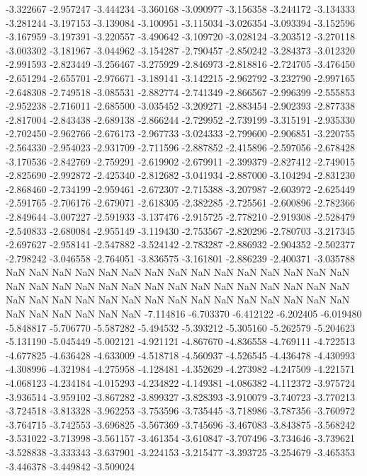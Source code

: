 -3.322667
-2.957247
-3.444234
-3.360168
-3.090977
-3.156358
-3.244172
-3.134333
-3.281244
-3.197153
-3.139084
-3.100951
-3.115034
-3.026354
-3.093394
-3.152596
-3.167959
-3.197391
-3.220557
-3.490642
-3.109720
-3.028124
-3.203512
-3.270118
-3.003302
-3.181967
-3.044962
-3.154287
-2.790457
-2.850242
-3.284373
-3.012320
-2.991593
-2.823449
-3.256467
-3.275929
-2.846973
-2.818816
-2.724705
-3.476450
-2.651294
-2.655701
-2.976671
-3.189141
-3.142215
-2.962792
-3.232790
-2.997165
-2.648308
-2.749518
-3.085531
-2.882774
-2.741349
-2.866567
-2.996399
-2.555853
-2.952238
-2.716011
-2.685500
-3.035452
-3.209271
-2.883454
-2.902393
-2.877338
-2.817004
-2.843438
-2.689138
-2.866244
-2.729952
-2.739199
-3.315191
-2.935330
-2.702450
-2.962766
-2.676173
-2.967733
-3.024333
-2.799600
-2.906851
-3.220755
-2.564330
-2.954023
-2.931709
-2.711596
-2.887852
-2.415896
-2.597056
-2.678428
-3.170536
-2.842769
-2.759291
-2.619902
-2.679911
-2.399379
-2.827412
-2.749015
-2.825690
-2.992872
-2.425340
-2.812682
-3.041934
-2.887000
-3.104294
-2.831230
-2.868460
-2.734199
-2.959461
-2.672307
-2.715388
-3.207987
-2.603972
-2.625449
-2.591765
-2.706176
-2.679071
-2.618305
-2.382285
-2.725561
-2.600896
-2.782366
-2.849644
-3.007227
-2.591933
-3.137476
-2.915725
-2.778210
-2.919308
-2.528479
-2.540833
-2.680084
-2.955149
-3.119430
-2.753567
-2.820296
-2.780703
-3.217345
-2.697627
-2.958141
-2.547882
-3.524142
-2.783287
-2.886932
-2.904352
-2.502377
-2.798242
-3.046558
-2.764051
-3.836575
-3.161801
-2.886239
-2.400371
-3.035788
NaN
NaN
NaN
NaN
NaN
NaN
NaN
NaN
NaN
NaN
NaN
NaN
NaN
NaN
NaN
NaN
NaN
NaN
NaN
NaN
NaN
NaN
NaN
NaN
NaN
NaN
NaN
NaN
NaN
NaN
NaN
NaN
NaN
NaN
NaN
NaN
NaN
NaN
NaN
NaN
NaN
NaN
NaN
NaN
NaN
NaN
NaN
NaN
NaN
NaN
NaN
-7.114816
-6.703370
-6.412122
-6.202405
-6.019480
-5.848817
-5.706770
-5.587282
-5.494532
-5.393212
-5.305160
-5.262579
-5.204623
-5.131190
-5.045449
-5.002121
-4.921121
-4.867670
-4.836558
-4.769111
-4.722513
-4.677825
-4.636428
-4.633009
-4.518718
-4.560937
-4.526545
-4.436478
-4.430993
-4.308996
-4.321984
-4.275958
-4.128481
-4.352629
-4.273982
-4.247509
-4.221571
-4.068123
-4.234184
-4.015293
-4.234822
-4.149381
-4.086382
-4.112372
-3.975724
-3.936514
-3.959102
-3.867282
-3.899327
-3.828393
-3.910079
-3.740723
-3.770213
-3.724518
-3.813328
-3.962253
-3.753596
-3.735445
-3.718986
-3.787356
-3.760972
-3.764715
-3.742553
-3.696825
-3.567369
-3.745696
-3.467083
-3.843875
-3.568242
-3.531022
-3.713998
-3.561157
-3.461354
-3.610847
-3.707496
-3.734646
-3.739621
-3.528838
-3.333343
-3.637901
-3.224153
-3.215477
-3.393725
-3.254679
-3.465353
-3.446378
-3.449842
-3.509024
